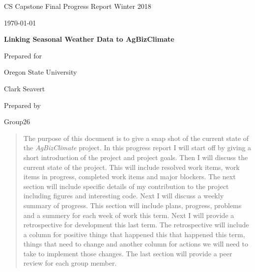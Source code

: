 \documentclass[onecolumn, draftclsnofoot,10pt, compsoc]{article}
\def \CapstoneTeamName{AgBizClimate}
\def \CapstoneTeamNumber{26}
\def \GroupMemberOne{}%
\def \CapstoneProjectName{ Linking Seasonal Weather Data to AgBizClimate\texttrademark}
\def \CapstoneSponsorCompany{ Oregon State University}
\def \CapstoneSponsorPerson{ Clark Seavert}
\def \DocType{		%
				Final Progress Report Winter 2018
				}
\newcommand{\NameSigPair}[1]{\par
\makebox[2.75in][r]{#1} \hfil 	\makebox[3.25in]{\makebox[2.25in]{\hrulefill} \hfill		\makebox[.75in]{\hrulefill}}
\par\vspace{-12pt} \textit{\tiny\noindent
\makebox[2.75in]{} \hfil		\makebox[3.25in]{\makebox[2.25in][r]{Signature} \hfill	\makebox[.75in][r]{Date}}}}
\renewcommand{\NameSigPair}[1]{#1}
\begin{document}
\begin{titlepage}
    \begin{singlespace}
        \hfill
        \par\vspace{.2in}
        \centering
        \scshape{
            \huge CS Capstone \DocType \par
            {\large\today}\par
            \vspace{.5in}
            \textbf{\Huge\CapstoneProjectName}\par
            \vfill
            {\large Prepared for}\par
            \Huge \CapstoneSponsorCompany\par
            \vspace{5pt}
            {\Large\NameSigPair{\CapstoneSponsorPerson}\par}
            {\large Prepared by }\par
            Group\CapstoneTeamNumber\par
            \vspace{5pt}
            {\Large
                \NameSigPair{\GroupMemberOne}\par
            }
            \vspace{20pt}
        }
        \begin{abstract}
					The purpose of this document is to give a snap shot of the current state of the \textit{AgBizClimate} project. In this progress report I will start off by giving a short introduction of the project and project goals. Then I will discuss the current state of the project. This will include resolved work items, work items in progress, completed work items and major blockers. The next section will include specific details of my contribution to the project including figures and interesting code. Next I will discuss a weekly summary of progress. This section will include plans, progress, problems and a summery for each week of work this term. Next I will provide a retrospective for development this last term. The retrospective will include a column for positive things that happened this that happened this term, things that need to change and another column for actions we will need to take to implement those changes. The last section will provide a peer review for each group member.\\
        \end{abstract}
    \end{singlespace}
\end{titlepage}
\newpage
{}
\tableofcontents
\newpage
\clearpage
\end{document}
